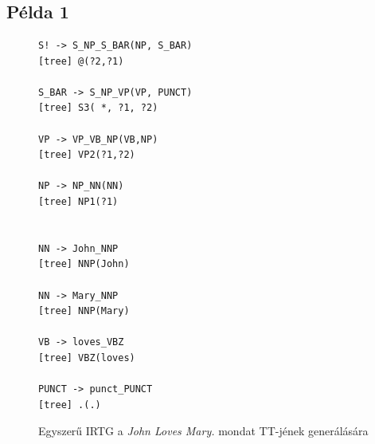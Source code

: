 \appendix
\chapter*{\fuggelek}
\setcounter{chapter}{\appendixnumber}



\section{Példa 1}
\label{sec:example1}

\begin{figure}[h]
\small
\begin{verbatim}
S! -> S_NP_S_BAR(NP, S_BAR)
[tree] @(?2,?1)

S_BAR -> S_NP_VP(VP, PUNCT)
[tree] S3( *, ?1, ?2)

VP -> VP_VB_NP(VB,NP)
[tree] VP2(?1,?2)

NP -> NP_NN(NN)
[tree] NP1(?1)


NN -> John_NNP
[tree] NNP(John)

NN -> Mary_NNP
[tree] NNP(Mary)

VB -> loves_VBZ
[tree] VBZ(loves)

PUNCT -> punct_PUNCT
[tree] .(.)
\end{verbatim}
\caption{Egyszerű IRTG a \textit{John Loves Mary.} mondat TT-jének generálására}
\label{cod:example1}
\end{figure}

